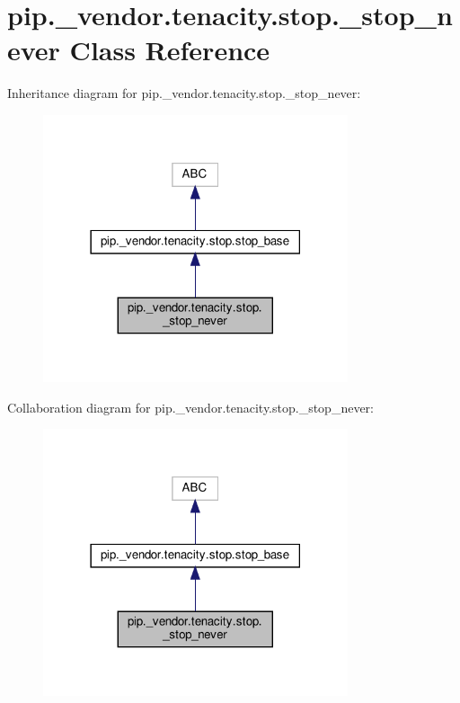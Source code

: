 \hypertarget{classpip_1_1__vendor_1_1tenacity_1_1stop_1_1__stop__never}{}\section{pip.\+\_\+vendor.\+tenacity.\+stop.\+\_\+stop\+\_\+never Class Reference}
\label{classpip_1_1__vendor_1_1tenacity_1_1stop_1_1__stop__never}


Inheritance diagram for pip.\+\_\+vendor.\+tenacity.\+stop.\+\_\+stop\+\_\+never\+:
\nopagebreak
\begin{figure}[H]
\begin{center}
\leavevmode
\includegraphics[width=254pt]{classpip_1_1__vendor_1_1tenacity_1_1stop_1_1__stop__never__inherit__graph}
\end{center}
\end{figure}


Collaboration diagram for pip.\+\_\+vendor.\+tenacity.\+stop.\+\_\+stop\+\_\+never\+:
\nopagebreak
\begin{figure}[H]
\begin{center}
\leavevmode
\includegraphics[width=254pt]{classpip_1_1__vendor_1_1tenacity_1_1stop_1_1__stop__never__coll__graph}
\end{center}
\end{figure}
